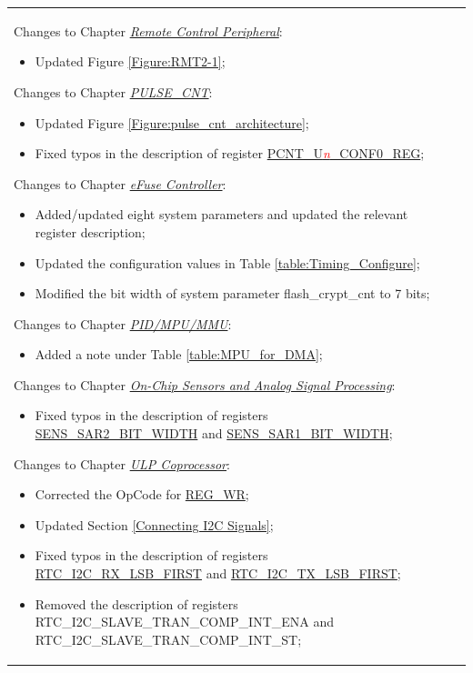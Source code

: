 \begin{longtable}[l]{ | m{2cm} | m{1.5cm} | m{12cm} | }
Changes to Chapter \hyperref[mod:rmt]{\it{Remote Control Peripheral}}:
\begin{itemize}
\item Updated Figure \ref{Figure:RMT2-1};
\end{itemize}

Changes to Chapter \hyperref[mod:pcnt]{\it{PULSE\_CNT}}:
\begin{itemize}
\item Updated Figure \ref{Figure:pulse_cnt_architecture};
\item Fixed typos in the description of register \hyperref[regdesc:PCNTUnCONF0REG]{PCNT\_U\textit{\textcolor{red}{\it{n}}}\_CONF0\_REG};
\end{itemize}

Changes to Chapter \hyperref[mod:efuse]{\it{eFuse Controller}}:
\begin{itemize}
\item Added/updated eight system parameters and updated the relevant register description;
\item Updated the configuration values in Table \ref{table:Timing_Configure};
\item Modified the bit width of system parameter flash\_crypt\_cnt to 7 bits;
\end{itemize}

Changes to Chapter \hyperref[mod:mmumpu]{\it{PID/MPU/MMU}}:
\begin{itemize}
\item Added a note under Table \ref{table:MPU_for_DMA};
\end{itemize}

Changes to Chapter \hyperref[mod:sensor]{\it{On-Chip Sensors and Analog Signal Processing}}:
\begin{itemize}
\item Fixed typos in the description of registers \hyperref[SENSSAR2BITWIDTH]{SENS\_SAR2\_BIT\_WIDTH} and \hyperref[SENSSAR1BITWIDTH]{SENS\_SAR1\_BIT\_WIDTH};
\end{itemize}

Changes to Chapter \hyperref[mod:ulp]{\it{ULP Coprocessor}}:
\begin{itemize}
\item Corrected the OpCode for \hyperref[subsection:REG_WR]{REG\_WR};
\item Updated Section \ref{Connecting I2C Signals};
\item Fixed typos in the description of registers \hyperref[RTCI2CRXLSBFIRST]{RTC\_I2C\_RX\_LSB\_FIRST} and \hyperref[RTCI2CTXLSBFIRST]{RTC\_I2C\_TX\_LSB\_FIRST};
\item Removed the description of registers RTC\_I2C\_SLAVE\_TRAN\_COMP\_INT\_ENA and RTC\_I2C\_SLAVE\_TRAN\_COMP\_INT\_ST;
\end{itemize}


\end{longtable}
